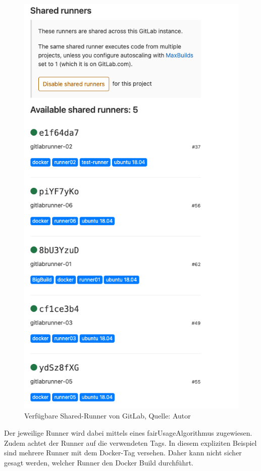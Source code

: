 \begin{figure}[H]
	\centering
	\includegraphics[scale=0.5]{images/gitLabRunner.png}
	\caption[Verfügbare Shared-Runner von GitLab]{Verfügbare Shared-Runner von GitLab, Quelle: Autor}
	\label{img: runnerGitlab}
\end{figure}
Der jeweilige Runner wird dabei mittels eines \gls{fairUsageAlgorithmus} zugewiesen. Zudem achtet der Runner auf die verwendeten Tags. In diesem expliziten Beispiel sind mehrere Runner mit dem Docker-Tag versehen. Daher kann nicht sicher gesagt werden, welcher Runner den Docker Build durchführt. 
